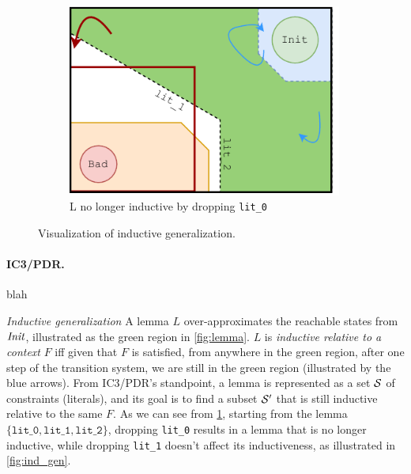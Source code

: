 \begin{figure}[t]
\begin{subfigure}[b]{0.3\textwidth}
    \includegraphics[width=0.99\textwidth]{figures/doping-lemma_not_ind.pdf}
    \caption{L no longer inductive by dropping \texttt{lit\_0}}
    \label{fig:not_ind_gen}
	\end{subfigure}

  \caption{Visualization of inductive generalization.}
  \label{fig:vis_ind_gen}
\end{figure}




\paragraph{IC3/PDR.}
blah

\emph{Inductive generalization} 
A lemma $L$ over-approximates the reachable states from $\mathit{Init}$, illustrated as the green region in \cref{fig:lemma}. $L$ is \textit{inductive relative to a context} $F$ iff given that $F$ is satisfied, from anywhere in the green region, after one step of the transition system, we are still in the green region (illustrated by the blue arrows). From IC3/PDR's standpoint, a lemma is represented as a set $\mathcal{S}$ of constraints (literals), and its goal is to find a subset $\mathcal{S}'$ that is still inductive relative to the same $F$. As we can see from \cref{fig:not_ind_gen}, starting from the lemma $\{\texttt{lit\_0}, \texttt{lit\_1}, \texttt{lit\_2}\}$, dropping \texttt{lit\_0} results in a lemma that is no longer inductive, while dropping \texttt{lit\_1} doesn't affect its inductiveness, as illustrated in \cref{fig:ind_gen}.

